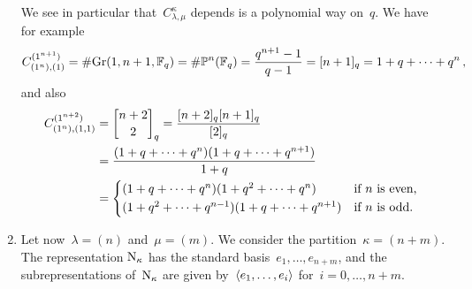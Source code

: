 \documentclass[a4paper,11pt]{scrartcl}
\begin{document}
\begin{example}
\begin{enumerate}
      We see in particular that~$C^{\kappa}_{\lambda, \mu}$ depends is a polynomial way on~$q$. 
      We have for example
      \[
        C^{(1^{n+1})}_{(1^n),(1)}
        =
        \# {\operatorname{Gr}(1, n+1, \mathbb{F}_q)}
        = 
        \# {\mathbb{P}^n(\mathbb{F}_q)}
        =
        \frac{ q^{n+1} - 1 }{ q - 1 }
        =
        [n+1]_q
        =
        1 + q + \dotsb + q^n \,,
      \]
      and also
      \begin{align*}
        C^{(1^{n+2})}_{(1^n),(1,1)}
        &=
        \qbinom{n+2}{2}_q
        =
        \frac{[n+2]_q [n+1]_q}{[2]_q}
        \\
        &=
        \frac{ (1 + q + \dotsb + q^n) (1 + q + \dotsb + q^{n+1}) }{ 1 + q }
        \\
        &=
        \begin{cases*}
          (1 + q + \dotsb + q^n) (1 + q^2 + \dotsb + q^n)
          &
          if~$n$ is even,
          \\
          (1 + q^2 + \dotsb + q^{n-1}) (1 + q + \dotsb + q^{n+1})
          &
          if~$n$ is odd.
        \end{cases*}
      \end{align*}
    \item
      Let now~$\lambda = (n)$ and~$\mu = (m)$.
      We consider the partition~$\kappa = (n+m)$. 
      The representation$~\mathrm{N}_{\kappa}$ has the standard basis~$e_1, \dotsc, e_{n+m}$, and the subrepresentations of~$\mathrm{N}_{\kappa}$ are given by~$\langle e_1, \dotsc, e_i\rangle$ for~$i = 0, \dotsc, n+m$.

\end{enumerate}
\end{example}
\end{document}
